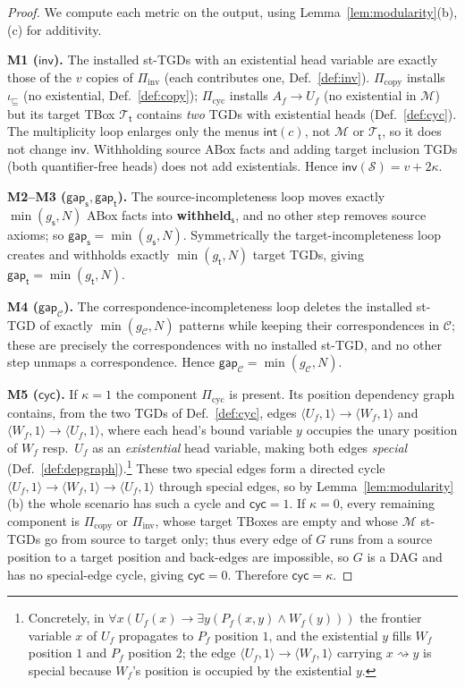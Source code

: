 \documentclass{amsart}
\theoremstyle{definition}
\newcommand{\Tbox}{\mathcal{T}}
\newcommand{\Map}{\mathcal{M}}
\newcommand{\src}{\mathsf{s}}
\newcommand{\trg}{\mathsf{t}}
\newcommand{\Scn}{\mathcal{S}}
\newcommand{\Cor}{\mathcal{C}}
\begin{document}
\begin{proof}
We compute each metric on the output, using
Lemma~\ref{lem:modularity}(b),(c) for additivity.

\textbf{M1 ($\mathsf{inv}$).} The installed st-TGDs with an existential head
variable are exactly those of the $v$ copies of $\Pi_{\mathrm{inv}}$ (each
contributes one, Def.~\ref{def:inv}). $\Pi_{\mathrm{copy}}$ installs
$\iota_\sqsubseteq$ (no existential, Def.~\ref{def:copy}); $\Pi_{\mathrm{cyc}}$
installs $A_f\to U_f$ (no existential in $\Map$) but its target TBox
$\Tbox_\trg$ contains \emph{two} TGDs with existential heads
(Def.~\ref{def:cyc}). The multiplicity loop enlarges only the menus
$\mathsf{int}(c)$, not $\Map$ or $\Tbox_\trg$, so it does not change
$\mathsf{inv}$. Withholding source ABox facts and adding target inclusion TGDs
(both quantifier-free heads) does not add existentials. Hence
$\mathsf{inv}(\Scn)=v+2\kappa$.

\textbf{M2--M3 ($\mathsf{gap}_\src,\mathsf{gap}_\trg$).} The source-incompleteness
loop moves exactly $\min(g_\src,N)$ ABox facts into \textbf{withheld}$_\src$, and
no other step removes source axioms; so $\mathsf{gap}_\src=\min(g_\src,N)$.
Symmetrically the target-incompleteness loop creates and withholds exactly
$\min(g_\trg,N)$ target TGDs, giving $\mathsf{gap}_\trg=\min(g_\trg,N)$.

\textbf{M4 ($\mathsf{gap}_\Cor$).} The correspondence-incompleteness loop deletes
the installed st-TGD of exactly $\min(g_\Cor,N)$ patterns while keeping their
correspondences in $\Cor$; these are precisely the correspondences with no
installed st-TGD, and no other step unmaps a correspondence. Hence
$\mathsf{gap}_\Cor=\min(g_\Cor,N)$.

\textbf{M5 ($\mathsf{cyc}$).} If $\kappa=1$ the component $\Pi_{\mathrm{cyc}}$ is
present. Its position dependency graph contains, from the two TGDs of
Def.~\ref{def:cyc}, edges $\langle U_f,1\rangle\to\langle W_f,1\rangle$ and
$\langle W_f,1\rangle\to\langle U_f,1\rangle$, where each head's bound variable
$y$ occupies the unary position of $W_f$ resp.\ $U_f$ as an \emph{existential}
head variable, making both edges \emph{special}
(Def.~\ref{def:depgraph}).\footnote{Concretely, in
$\forall x(U_f(x)\to\exists y(P_f(x,y)\wedge W_f(y)))$ the frontier variable $x$
of $U_f$ propagates to $P_f$ position $1$, and the existential $y$ fills $W_f$
position $1$ and $P_f$ position $2$; the edge $\langle U_f,1\rangle\to\langle
W_f,1\rangle$ carrying $x\!\rightsquigarrow\!y$ is special because $W_f$'s
position is occupied by the existential $y$.} These two special edges form a
directed cycle $\langle U_f,1\rangle\to\langle W_f,1\rangle\to\langle U_f,1\rangle$
through special edges, so by Lemma~\ref{lem:modularity}(b) the whole scenario has
such a cycle and $\mathsf{cyc}=1$. If $\kappa=0$, every remaining component is
$\Pi_{\mathrm{copy}}$ or $\Pi_{\mathrm{inv}}$, whose target TBoxes are empty and
whose $\Map$ st-TGDs go from source to target only; thus every edge of $G$ runs
from a source position to a target position and back-edges are impossible, so $G$
is a DAG and has no special-edge cycle, giving $\mathsf{cyc}=0$. Therefore
$\mathsf{cyc}=\kappa$.


\end{proof}
\end{document}
